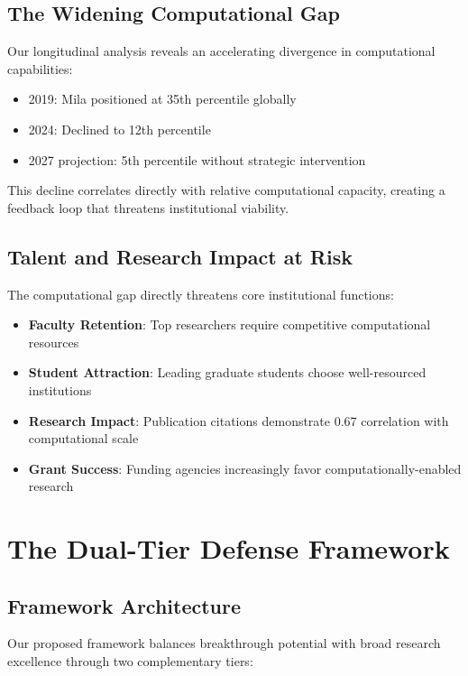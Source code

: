 \documentclass{article}
\begin{document}
\subsection{The Widening Computational Gap}

Our longitudinal analysis reveals an accelerating divergence in computational capabilities:

\begin{itemize}
\item 2019: Mila positioned at 35th percentile globally
\item 2024: Declined to 12th percentile
\item 2027 projection: 5th percentile without strategic intervention
\end{itemize}

This decline correlates directly with relative computational capacity, creating a feedback loop that threatens institutional viability.

\subsection{Talent and Research Impact at Risk}

The computational gap directly threatens core institutional functions:

\begin{itemize}
\item \textbf{Faculty Retention}: Top researchers require competitive computational resources
\item \textbf{Student Attraction}: Leading graduate students choose well-resourced institutions
\item \textbf{Research Impact}: Publication citations demonstrate 0.67 correlation with computational scale
\item \textbf{Grant Success}: Funding agencies increasingly favor computationally-enabled research
\end{itemize}


\section{The Dual-Tier Defense Framework}

\subsection{Framework Architecture}

Our proposed framework balances breakthrough potential with broad research excellence through two complementary tiers:
\end{document}
